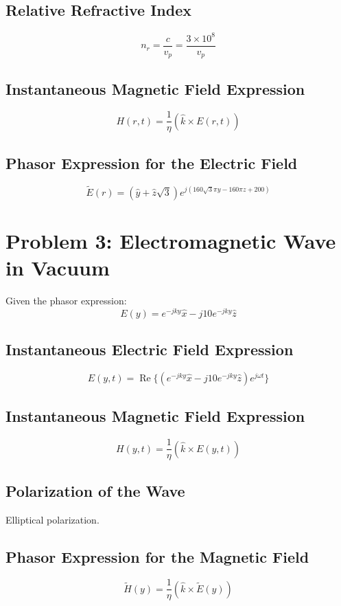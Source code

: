 \documentclass{include/src/sbu-report}  %
\begin{document}
\subsection{Relative Refractive Index}
\begin{equation}
    n_r = \frac{c}{v_p} = \frac{3 \times 10^8}{v_p}
\end{equation}

\subsection{Instantaneous Magnetic Field Expression}
\begin{equation}
    H(r,t) = \frac{1}{\eta} \left( \hat{k} \times E(r,t) \right)
\end{equation}

\subsection{Phasor Expression for the Electric Field}
\begin{equation}
    \tilde{E}(r) = (\hat{y} + \hat{z} \sqrt{3}) e^{j(160\sqrt{3}\pi y - 160\pi z + 200)}
\end{equation}

\section{Problem 3: Electromagnetic Wave in Vacuum}
Given the phasor expression:
\begin{equation}
    E(y) = e^{-jky} \hat{x} - j 10 e^{-jky} \hat{z}
\end{equation}

\subsection{Instantaneous Electric Field Expression}
\begin{equation}
    E(y,t) = \operatorname{Re} \{ (e^{-jky} \hat{x} - j 10 e^{-jky} \hat{z}) e^{j\omega t} \}
\end{equation}

\subsection{Instantaneous Magnetic Field Expression}
\begin{equation}
    H(y,t) = \frac{1}{\eta} \left( \hat{k} \times E(y,t) \right)
\end{equation}

\subsection{Polarization of the Wave}
Elliptical polarization.

\subsection{Phasor Expression for the Magnetic Field}
\begin{equation}
    \tilde{H}(y) = \frac{1}{\eta} \left( \hat{k} \times \tilde{E}(y) \right)
\end{equation}
\end{document}

